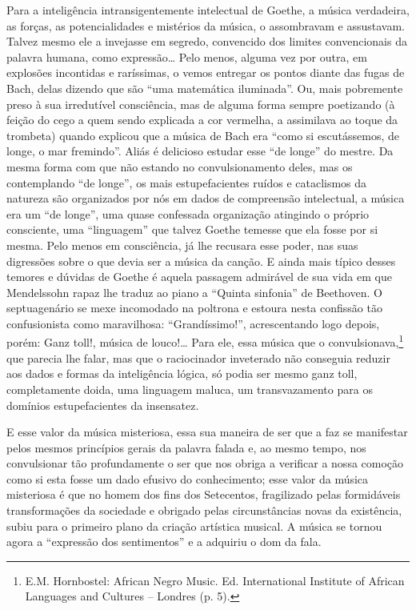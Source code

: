 Para a inteligência intransigentemente intelectual de Goethe, a música
verdadeira, as forças, as potencialidades e mistérios da música, o
assombravam e assustavam. Talvez mesmo ele a invejasse em segredo,
convencido dos limites convencionais da palavra humana, como
expressão\ldots{} Pelo menos, alguma vez por outra, em explosões incontidas e
raríssimas, o vemos entregar os pontos diante das fugas de Bach, delas
dizendo que são ``uma matemática iluminada''. Ou, mais pobremente preso
à sua irredutível consciência, mas de alguma forma sempre poetizando (à
feição do cego a quem sendo explicada a cor vermelha, a assimilava ao
toque da trombeta) quando explicou que a música de Bach era ``como si
escutássemos, de longe, o mar fremindo''. Aliás é delicioso estudar esse
``de longe'' do mestre. Da mesma forma com que não estando no
convulsionamento deles, mas os contemplando ``de longe'', os mais
estupefacientes ruídos e cataclismos da natureza são organizados por nós
em dados de compreensão intelectual, a música era um ``de longe'', uma
quase confessada organização atingindo o próprio consciente, uma
``linguagem'' que talvez Goethe temesse que ela fosse por si mesma. Pelo
menos em consciência, já lhe recusara esse poder, nas suas digressões
sobre o que devia ser a música da canção. E ainda mais típico desses
temores e dúvidas de Goethe é aquela passagem admirável de sua vida em
que Mendelssohn rapaz lhe traduz ao piano a ``Quinta sinfonia'' de
Beethoven. O septuagenário se mexe incomodado na poltrona e estoura
nesta confissão tão confusionista como maravilhosa: ``Grandíssimo!'',
acrescentando logo depois, porém: Ganz toll!, música de louco!\ldots{} Para
ele, essa música que o convulsionava,\footnote{E.M. Hornbostel: African Negro Music. Ed. International Institute of
African Languages and Cultures -- Londres (p. 5).} que parecia lhe falar, mas que
o raciocinador inveterado não conseguia reduzir aos dados e formas da
inteligência lógica, só podia ser mesmo ganz toll, completamente doida,
uma linguagem maluca, um transvazamento para os domínios estupefacientes
da insensatez.

E esse valor da música misteriosa, essa sua maneira de ser que a faz se
manifestar pelos mesmos princípios gerais da palavra falada e, ao mesmo
tempo, nos convulsionar tão profundamente o ser que nos obriga a
verificar a nossa comoção como si esta fosse um dado efusivo do
conhecimento; esse valor da música misteriosa é que no homem dos fins
dos Setecentos, fragilizado pelas formidáveis transformações da
sociedade e obrigado pelas circunstâncias novas da existência, subiu
para o primeiro plano da criação artística musical. A música se tornou
agora a ``expressão dos sentimentos'' e a adquiriu o dom da fala.


